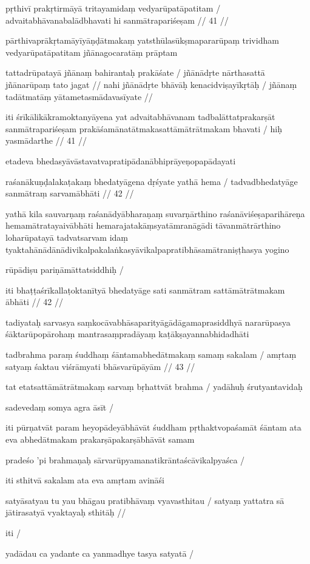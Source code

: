 pṛthivī prakṛtirmāyā tritayamidaṃ vedyarūpatāpatitam  /
advaitabhāvanabalādbhavati hi sanmātrapariśeṣam  // 41  //

pārthivaprākṛtamāyīyāṇḍātmakaṃ yatsthūlasūkṣmapararūpaṃ trividham vedyarūpatāpatitam jñānagocaratāṃ prāptam

tattadrūpatayā jñānaṃ bahirantaḥ prakāśate  /
jñānādṛte nārthasattā jñānarūpaṃ tato jagat  //
nahi jñānādṛte bhāvāḥ kenacidviṣayīkṛtāḥ  /
jñānaṃ tadātmatāṃ yātametasmādavasīyate  //

iti śrīkālikākramoktanyāyena yat advaitabhāvanam tadbalāttatprakarṣāt sanmātrapariśeṣam prakāśamānatātmakasattāmātrātmakam bhavati  / hiḥ yasmādarthe  // 41  //

etadeva bhedasyāvāstavatvapratipādanābhiprāyeṇopapādayati

raśanākuṇḍalakaṭakaṃ bhedatyāgena dṛśyate yathā hema  /
tadvadbhedatyāge sanmātraṃ sarvamābhāti  // 42  //

yathā kila sauvarṇaṃ raśanādyābharaṇaṃ suvarṇārthino raśanāviśeṣaparihāreṇa hemamātratayaivābhāti hemarajatakāṃsyatāmranāgādi tāvanmātrārthino loharūpatayā tadvatsarvam idaṃ tyaktahānādānādivikalpakalaṅkasyāvikalpapratibhāsamātraniṣṭhasya yogino

rūpādiṣu pariṇāmāttatsiddhiḥ  /

iti bhaṭṭaśrīkallaṭoktanītyā bhedatyāge sati sanmātram sattāmātrātmakam ābhāti  // 42  //

tadiyataḥ sarvasya saṃkocāvabhāsaparityāgādāgamaprasiddhyā nararūpasya śāktarūpopārohaṃ mantrasaṃpradāyaṃ kaṭākṣayannabhidadhāti

tadbrahma paraṃ śuddhaṃ śāntamabhedātmakaṃ samaṃ sakalam  /
amṛtaṃ satyaṃ śaktau viśrāmyati bhāsvarūpāyām  // 43  //

tat etatsattāmātrātmakaṃ sarvaṃ bṛhattvāt brahma  / yadāhuḥ śrutyantavidaḥ

sadevedaṃ somya agra āsīt  /

iti pūrṇatvāt param heyopādeyābhāvāt śuddham pṛthaktvopaśamāt śāntam ata eva abhedātmakam prakarṣāpakarṣābhāvāt samam

pradeśo 'pi brahmaṇaḥ sārvarūpyamanatikrāntaścāvikalpyaśca  /

iti sthitvā sakalam ata eva amṛtam avināśi

satyāsatyau tu yau bhāgau pratibhāvaṃ vyavasthitau  /
satyaṃ yattatra sā jātirasatyā vyaktayaḥ sthitāḥ  //

iti  /

yadādau ca yadante ca yanmadhye tasya satyatā  /

